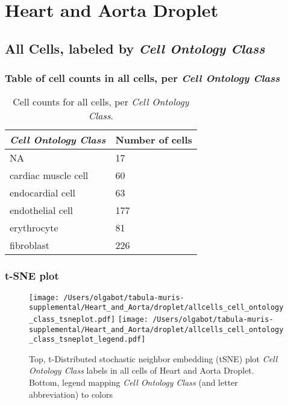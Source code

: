 \clearpage
\section{Heart and Aorta Droplet}

\subsection{All Cells, labeled by \emph{Cell Ontology Class}}
\subsubsection{Table of cell counts in all cells, per \emph{Cell Ontology Class}}\begin{table}[h]
\centering
\label{my-label}
\begin{tabular}{@{}ll@{}}
\toprule

\emph{Cell Ontology Class}& Number of cells \\ \midrule
NA & 17 \\

cardiac muscle cell & 60 \\

endocardial cell & 63 \\

endothelial cell & 177 \\

erythrocyte & 81 \\

fibroblast & 226 \\
\bottomrule
\end{tabular}
\caption{Cell counts for all cells, per \emph{Cell Ontology Class}.}
\end{table}

\clearpage
\subsubsection{t-SNE plot}
\begin{figure}[h]
\centering
\texttt{[image: /Users/olgabot/tabula-muris-supplemental/Heart\_and\_Aorta/droplet/allcells\_cell\_ontology\_class\_tsneplot.pdf]}
\texttt{[image: /Users/olgabot/tabula-muris-supplemental/Heart\_and\_Aorta/droplet/allcells\_cell\_ontology\_class\_tsneplot\_legend.pdf]}
\caption{Top, t-Distributed stochastic neighbor embedding (tSNE) plot  \emph{Cell Ontology Class} labels in all cells of Heart and Aorta Droplet. Bottom, legend mapping \emph{Cell Ontology Class} (and letter abbreviation) to colors}
\end{figure}


